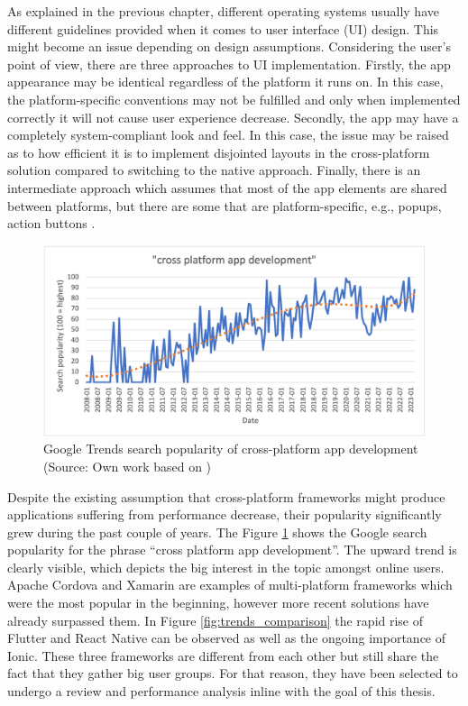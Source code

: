 As explained in the previous chapter, different operating systems usually have different guidelines provided when it comes to user interface (UI) design. This might become an issue depending on design assumptions. Considering the user's point of view, there are three approaches to UI implementation. Firstly, the app appearance may be identical regardless of the platform it runs on. In this case, the platform-specific conventions may not be fulfilled and only when implemented correctly it will not cause user experience decrease. Secondly, the app may have a completely system-compliant look and feel. In this case, the issue may be raised as to how efficient it is to implement disjointed layouts in the cross-platform solution compared to switching to the native approach. Finally, there is an intermediate approach which assumes that most of the app elements are shared between platforms, but there are some that are platform-specific, e.g., popups, action buttons \cite{cross_platform_ux,baseline_cross_platform}.

\begin{figure}[h]
    \centering
    \includegraphics[width=\textwidth]{img/google_trends_cross_platform}
    \caption{Google Trends search popularity of cross-platform app development (Source: Own work based on \cite{trends_cross_platform})}
    \label{fig:trends_cross_platform}
\end{figure}

Despite the existing assumption that cross-platform frameworks might produce applications suffering from performance decrease, their popularity significantly grew during the past couple of years. The Figure \ref{fig:trends_cross_platform} shows the Google search popularity for the phrase ``cross platform app development''. The upward trend is clearly visible, which depicts the big interest in the topic amongst online users. Apache Cordova and Xamarin are examples of multi-platform frameworks which were the most popular in the beginning, however more recent solutions have already surpassed them. In Figure \ref{fig:trends_comparison} the rapid rise of Flutter and React Native can be observed as well as the ongoing importance of Ionic. These three frameworks are different from each other but still share the fact that they gather big user groups. For that reason, they have been selected to undergo a review and performance analysis inline with the goal of this thesis.

